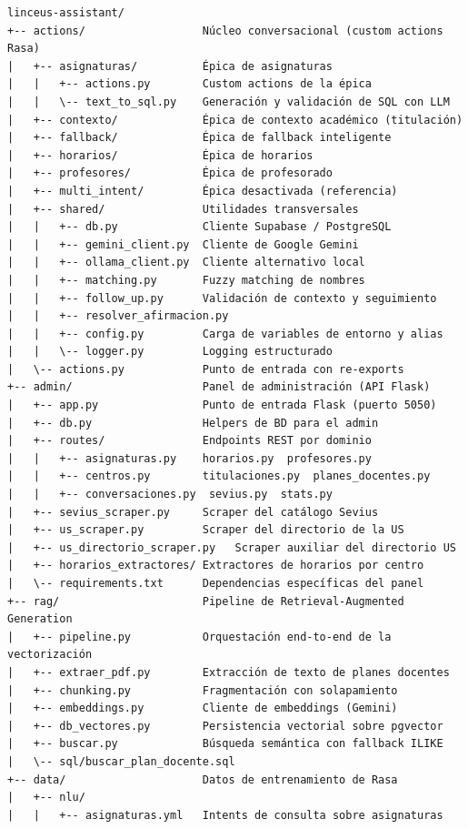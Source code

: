 \begingroup\footnotesize
\begin{verbatim}
linceus-assistant/
+-- actions/                  Núcleo conversacional (custom actions Rasa)
|   +-- asignaturas/          Épica de asignaturas
|   |   +-- actions.py        Custom actions de la épica
|   |   \-- text_to_sql.py    Generación y validación de SQL con LLM
|   +-- contexto/             Épica de contexto académico (titulación)
|   +-- fallback/             Épica de fallback inteligente
|   +-- horarios/             Épica de horarios
|   +-- profesores/           Épica de profesorado
|   +-- multi_intent/         Épica desactivada (referencia)
|   +-- shared/               Utilidades transversales
|   |   +-- db.py             Cliente Supabase / PostgreSQL
|   |   +-- gemini_client.py  Cliente de Google Gemini
|   |   +-- ollama_client.py  Cliente alternativo local
|   |   +-- matching.py       Fuzzy matching de nombres
|   |   +-- follow_up.py      Validación de contexto y seguimiento
|   |   +-- resolver_afirmacion.py
|   |   +-- config.py         Carga de variables de entorno y alias
|   |   \-- logger.py         Logging estructurado
|   \-- actions.py            Punto de entrada con re-exports
+-- admin/                    Panel de administración (API Flask)
|   +-- app.py                Punto de entrada Flask (puerto 5050)
|   +-- db.py                 Helpers de BD para el admin
|   +-- routes/               Endpoints REST por dominio
|   |   +-- asignaturas.py    horarios.py  profesores.py
|   |   +-- centros.py        titulaciones.py  planes_docentes.py
|   |   +-- conversaciones.py  sevius.py  stats.py
|   +-- sevius_scraper.py     Scraper del catálogo Sevius
|   +-- us_scraper.py         Scraper del directorio de la US
|   +-- us_directorio_scraper.py   Scraper auxiliar del directorio US
|   +-- horarios_extractores/ Extractores de horarios por centro
|   \-- requirements.txt      Dependencias específicas del panel
+-- rag/                      Pipeline de Retrieval-Augmented Generation
|   +-- pipeline.py           Orquestación end-to-end de la vectorización
|   +-- extraer_pdf.py        Extracción de texto de planes docentes
|   +-- chunking.py           Fragmentación con solapamiento
|   +-- embeddings.py         Cliente de embeddings (Gemini)
|   +-- db_vectores.py        Persistencia vectorial sobre pgvector
|   +-- buscar.py             Búsqueda semántica con fallback ILIKE
|   \-- sql/buscar_plan_docente.sql
+-- data/                     Datos de entrenamiento de Rasa
|   +-- nlu/
|   |   +-- asignaturas.yml   Intents de consulta sobre asignaturas

\end{verbatim}
